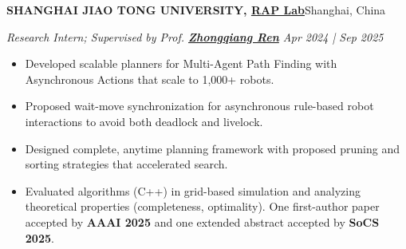 \documentclass[a4paper,9pt]{extarticle}
\begin{document}
\par\textbf{SHANGHAI JIAO TONG UNIVERSITY, {\href{https://rap-lab.github.io/}{RAP Lab}}}\hfill Shanghai, China  %
\par\textit{Research Intern; Supervised by Prof. {\href{https://rap-lab.github.io/team/zren/}{\textbf{Zhongqiang Ren}}} \hfill   Apr 2024 | Sep 2025} %
\begin{itemize}
    \item Developed scalable planners for Multi-Agent Path Finding with Asynchronous Actions that scale to 1,000+ robots.
    \item Proposed wait-move synchronization for asynchronous rule-based robot interactions to avoid both deadlock and livelock.
    \item Designed complete, anytime planning framework with proposed pruning and sorting strategies that accelerated search. 
    \item Evaluated algorithms (C++) in grid-based simulation and analyzing theoretical properties (completeness, optimality). One first-author paper accepted by \textbf{AAAI 2025} and one extended abstract accepted by \textbf{SoCS 2025}.
\end{itemize}
\end{document}
